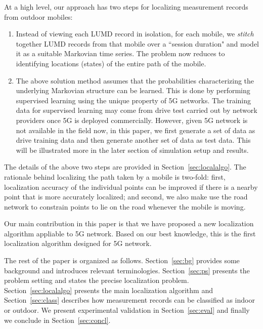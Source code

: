 \documentclass[conference, 10pt]{IEEEtran}
\begin{document}
At a high level, our approach has two steps for
localizing measurement records from outdoor mobiles:

\begin{enumerate}
\item Instead of viewing each LUMD record in isolation, for each mobile, we {\em stitch}
together LUMD records from that mobile over a ``session
duration"  and model it as a suitable Markovian time series. The problem now
reduces to identifying locations (states) of the entire path of
the mobile.

\item The above solution method assumes that the probabilities characterizing the
underlying Markovian structure can be learned. This is done by performing supervised learning using the unique property of 5G networks.
The training data for supervised learning may come from
drive test carried out by network providers once 5G is deployed commercially. However, given 5G network is not available in the field now, 
in this paper, we first generate a set of data as drive training data and then generate another set of data as test data. This will be illustrated more in the 
later section of simulation setup and results. 
	
\end{enumerate}

The details of the above two steps are provided in Section~\ref{sec:localalgo}.
The rationale behind localizing the path taken by a mobile is two-fold: first,
localization accuracy of the individual points can be improved if there is a
nearby point that is more accurately localized; and second, we also make use the
road network to constrain points to lie on the road whenever the mobile is
moving. 

Our main contribution in this paper is that we have proposed a new localization algorithm
appliable to 5G network. Based on our best knowledge, this is the first localization algorithm designed for 5G network. 


The rest of the paper is organized as follows. Section~\ref{sec:bg} provides some
background and introduces relevant terminologies. Section~\ref{sec:ps} presents
the problem setting and states the precise localization problem.
Section~\ref{sec:localalgo}
presents the main localization algorithm and Section~\ref{sec:class} describes 
how measurement records can be classified as indoor or outdoor. We present
experimental validation in Section~\ref{sec:eval} and finally we conclude in
Section~\ref{sec:concl}.
\end{document}
